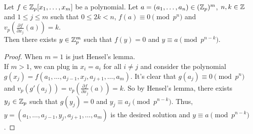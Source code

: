 \documentclass[15pt]{scrartcl}
\begin{document}
\begin{theorem}
    Let $f\in \mathbb Z_p[x_1,\ldots,x_m]$ be a polynomial. Let $a=(a_1,\ldots,a_n)\in (\mathbb Z_p)^m$, $n, k\in \mathbb Z$  and $1\leq j \leq m$ such that $0\leq 2k <n$, $f(a)\equiv 0\pmod{p^n}$ and $v_p\left(\frac{\partial f}{\partial x_j}(a)\right)=k$. 
    \\

    Then there exists $y\in \mathbb Z_p^m$ such that $f(y)=0$ and $y\equiv a\pmod{p^{n-k}}$.
\end{theorem}
\begin{proof}
    When $m=1$ is just Hensel's lemma. 
    \\

    If $m>1$, we can plug in $x_i=a_i$ for all $i\neq j$ and consider the polynomial $g(x_j)=f(a_1,\ldots,a_{j-1},x_j,a_{j+1},\ldots,a_m)$. It's clear that $g(a_j)\equiv 0\pmod{p^n}$ and $v_p(g'(a_j))=v_p\left(\frac{\partial f}{\partial x_j}(a)\right)=k$. So by Hensel's lemma, there exists $y_j\in \mathbb Z_p$ such that $g(y_j)=0$ and $y_j\equiv a_j \pmod{p^{n-k}}$. Thus, $y=(a_1,\ldots,a_{j-1},y_j,a_{j+1},\ldots,a_m)$ is the desired solution and $y\equiv a\pmod{p^{n-k}}$.
\end{proof}
\end{document}
